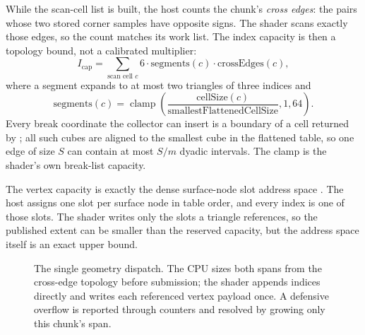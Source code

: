 While the scan-cell list is built, the host counts the chunk's
\emph{cross edges}: the  pairs whose two stored
corner samples have opposite signs.  The shader scans exactly those edges,
so the count matches its work list.  The index capacity is then a topology
bound, not a calibrated multiplier:
\begin{equation}
  I_{\text{cap}} =
  \sum_{\text{scan cell }c}
    6 \cdot \text{segments}(c) \cdot \text{crossEdges}(c),
  \label{eq:indexcap}
\end{equation}
where a segment expands to at most two triangles of three indices and
\begin{equation}
  \text{segments}(c) =
  \operatorname{clamp}\!\left(
    \frac{\text{cellSize}(c)}{\text{smallestFlattenedCellSize}},
    1, 64\right).
  \label{eq:segments}
\end{equation}
Every break coordinate the collector can insert is a boundary of a cell
returned by ; all such cubes are aligned to the smallest
cube in the flattened table, so one edge of size $S$ can contain at most
$S/m$ dyadic intervals.  The clamp is the shader's own break-list capacity.

The vertex capacity is exactly the dense surface-node slot address space
.  The host assigns one slot per surface node in
table order, and every index is one of those slots.  The shader writes only
the slots a triangle references, so the published extent can be smaller
than the reserved capacity, but the address space itself is an exact upper
bound.

\begin{figure}[htbp]
\centering
{}
\caption{The single geometry dispatch.  The CPU sizes both spans from the
cross-edge topology before submission; the shader appends indices directly
and writes each referenced vertex payload once.  A defensive overflow is
reported through counters and resolved by growing only this chunk's span.}
\label{fig:geometrypass}
\end{figure}

